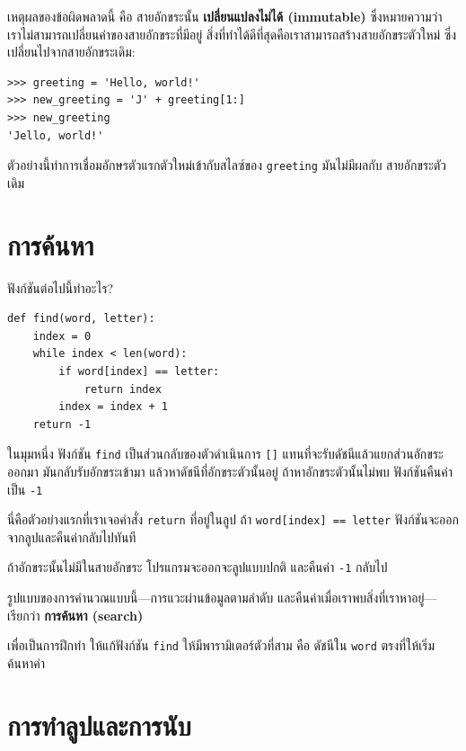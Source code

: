 เหตุผลของข้อผิดพลาดนี้ คือ สายอักขระนั้น {\bf เปลี่ยนแปลงไม่ได้ (immutable)} ซึ่งหมายความว่า
เราไม่สามารถเปลี่ยนค่าของสายอักขระที่มีอยู่ สิ่งที่ทำได้ดีที่สุดคือเราสามารถสร้างสายอักขระตัวใหม่
ซึ่งเปลี่ยนไปจากสายอักขระเดิม:

\begin{verbatim}
>>> greeting = 'Hello, world!'
>>> new_greeting = 'J' + greeting[1:]
>>> new_greeting
'Jello, world!'
\end{verbatim}
%
ตัวอย่างนี้ทำการเชื่อมอักษรตัวแรกตัวใหม่เข้ากับสไลซ์ของ {\tt greeting} มันไม่มีผลกับ
สายอักขระตัวเดิม


\section{การค้นหา} %
\label{find}

ฟังก์ชันต่อไปนี้ทำอะไร?

\begin{verbatim}
def find(word, letter):
    index = 0
    while index < len(word):
        if word[index] == letter:
            return index
        index = index + 1
    return -1
\end{verbatim}
%
ในมุมหนึ่ง ฟังก์ชัน {\tt find} เป็นส่วนกลับของตัวดำเนินการ {\tt []} 
แทนที่จะรับดัชนีแล้วแยกส่วนอักขระออกมา มันกลับรับอักขระเข้ามา แล้วหาดัชนีที่อักขระตัวนั้นอยู่
ถ้าหาอักขระตัวนั้นไม่พบ ฟังก์ชันคืนค่าเป็น {\tt -1}

นี่คือตัวอย่างแรกที่เราเจอคำสั่ง {\tt return} ที่อยู่ในลูป ถ้า {\tt word[index] == letter}
ฟังก์ชันจะออกจากลูปและคืนค่ากลับไปทันที

ถ้าอักขระนั้นไม่มีในสายอักขระ โปรแกรมจะออกจะลูปแบบปกติ และคืนค่า {\tt -1} กลับไป

รูปแบบของการคำนวณแบบนี้---การแวะผ่านข้อมูลตามลำดับ และคืนค่าเมื่อเราพบสิ่งที่เราหาอยู่---
เรียกว่า {\bf การค้นหา (search)}

เพื่อเป็นการฝึกทำ ให้แก้ฟังก์ชัน {\tt find} ให้มีพารามิเตอร์ตัวที่สาม คือ ดัชนีใน 
{\tt word} ตรงที่ให้เริ่มค้นหาค่า


\section{การทำลูปและการนับ} %
\label{counter}

